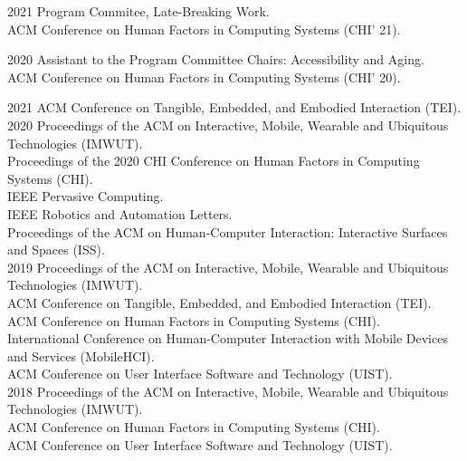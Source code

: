 
    \begin{cvreviews}
      \cvreview
        {2021}
        {Program Commitee, Late-Breaking Work. \\
        ACM Conference on Human Factors in Computing Systems (CHI' 21).}
    \end{cvreviews}

    \begin{cvreviews}
      \cvreview
        {2020}
        {Assistant to the Program Committee Chairs: Accessibility and Aging. \\
        ACM Conference on Human Factors in Computing Systems (CHI' 20).}
    \end{cvreviews}

    \begin{cvreviews}
      \cvreview
        {2021}
        {ACM Conference on Tangible, Embedded, and Embodied Interaction (TEI).\\}
      \cvreview
        {2020}
        {Proceedings of the ACM on Interactive, Mobile, Wearable and Ubiquitous Technologies (IMWUT).\\
        Proceedings of the 2020 CHI Conference on Human Factors in Computing Systems (CHI).\\
        IEEE Pervasive Computing.\\
        IEEE Robotics and Automation Letters.\\
        Proceedings of the ACM on Human-Computer Interaction: Interactive Surfaces and Spaces (ISS).\\}
      \cvreview
        {2019}
        {Proceedings of the ACM on Interactive, Mobile, Wearable and Ubiquitous Technologies (IMWUT).\\
        ACM Conference on Tangible, Embedded, and Embodied Interaction (TEI).\\
        ACM Conference on Human Factors in Computing Systems (CHI).\\
        International Conference on Human-Computer Interaction with Mobile Devices and Services (MobileHCI).\\
        ACM Conference on User Interface Software and Technology (UIST). \\}
      \cvreview
        {2018}
        {Proceedings of the ACM on Interactive, Mobile, Wearable and Ubiquitous Technologies (IMWUT).\\
        ACM Conference on Human Factors in Computing Systems (CHI).\\
        ACM Conference on User Interface Software and Technology (UIST). \\}
    \end{cvreviews}
